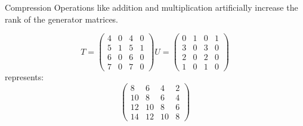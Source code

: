 \begin{frame}{Compression}
  Operations like addition and multiplication artificially
  increase the rank of the generator matrices.

  \[
    T =
    \begin{pmatrix}
      4 & 0 & 4 & 0 \\
      5 & 1 & 5 & 1 \\
      6 & 0 & 6 & 0 \\
      7 & 0 & 7 & 0
    \end{pmatrix}
    U =
    \begin{pmatrix}
      0 & 1 & 0 & 1 \\
      3 & 0 & 3 & 0 \\
      2 & 0 & 2 & 0 \\
      1 & 0 & 1 & 0
    \end{pmatrix}
  \]
  represents:
  \[
    \begin{pmatrix}
      8 & 6 & 4 & 2 \\
      10 & 8 & 6 & 4 \\
      12 & 10 & 8 & 6 \\
      14 & 12 & 10 & 8
    \end{pmatrix}
  \]
\end{frame}

